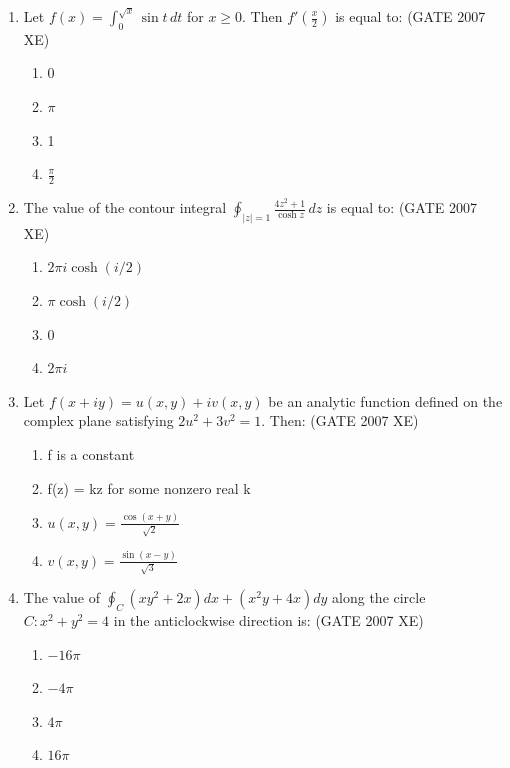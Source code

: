 \documentclass[journal,cmex10]{IEEEtran}
\theoremstyle{remark}
\numberwithin{equation}{enumi}
\numberwithin{figure}{enumi}
\begin{document}
\begin{enumerate}
    \item Let $f(x) = \int_{0}^{\sqrt{x}} \sin t \, dt$ for  $x \geq 0$. Then $f'\left(\frac{x}{2}\right)$ is equal to:
    \hfill{(GATE 2007 XE)}
    \begin{multicols}{4}
    \begin{enumerate}
        \item 0
        \item $\pi$
        \item 1
        \item $\frac{\pi}{2}$
    \end{enumerate}
\end{multicols}

    \item The value of the contour integral $\oint_{|z|=1} \frac{4z^2 + 1}{\cosh z} \, dz$ is equal to:
    \hfill{(GATE 2007 XE)}
\begin{multicols}{4}
    \begin{enumerate}
        \item $2\pi i \cosh(i/2)$
        \item $\pi \cosh(i/2)$
        \item 0
        \item $2\pi i$
    \end{enumerate}
    \end{multicols}

    \item Let  $f(x+iy) = u(x,y) + iv(x,y)$ be an analytic function defined on the complex plane satisfying $2u^2 + 3v^2 = 1$. Then:
    \hfill{(GATE 2007 XE)}
    \begin{multicols}{4}
    \begin{enumerate}
        \item  f  is a constant
        \item f(z) = kz for some nonzero real k 
        \item $u(x,y) = \frac{\cos(x+y)}{\sqrt{2}}$
        \item $v(x,y) = \frac{\sin(x-y)}{\sqrt{3}}$
    \end{enumerate}
\end{multicols}

    \item The value of $\oint_C \left( xy^2 + 2x \right) dx + \left( x^2 y + 4x \right) dy$ along the circle $C: x^2 + y^2 = 4$ in the anticlockwise direction is:
    \hfill{(GATE 2007 XE)}
    \begin{multicols}{4}
    \begin{enumerate}
        \item $-16\pi$
        \item $-4\pi$
        \item $4\pi$
        \item $16\pi$
    \end{enumerate}
\end{multicols}


\end{enumerate}
\end{document}
